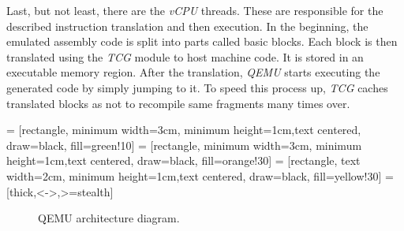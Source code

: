 Last, but not least, there are the \textit{vCPU} threads. These are responsible for the described instruction translation and then execution. In the beginning, the emulated assembly code is split into parts called basic blocks. Each block is then translated using the \textit{TCG} module to host machine code. It is stored in an executable memory region. After the translation, \textit{QEMU} starts executing the generated code by simply jumping to it. To speed this process up, \textit{TCG} caches translated blocks as not to recompile same fragments many times over. 

 = [rectangle, minimum width=3cm, minimum height=1cm,text centered, draw=black, fill=green!10]
 = [rectangle, minimum width=3cm, minimum height=1cm,text centered, draw=black, fill=orange!30]
 = [rectangle, text width=2cm, minimum height=1cm,text centered, draw=black, fill=yellow!30]
 = [thick,<->,>=stealth]

\begin{figure}[h!]
    \centering

    
    \caption{QEMU architecture diagram.}
    \label{fig:qemuarch}
\end{figure}

